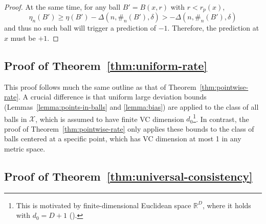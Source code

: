 \documentclass{article}
\def\X{{\mathcal X}}
\newcommand{\comment}[3]{{\color{#1} {\bf #2 :} #3}}
\newcommand{\sanjoy}[1]{\comment{orange}{Sanjoy}{#1}}
\begin{document}
\begin{proof}
At the same time, for any ball $B' = B(x, r)$ with $r < r_p(x)$,
$$ \eta_n(B') \geq \eta(B') - \Delta(n, \#_n(B'), \delta) > -\Delta(n, \#_n(B'), \delta) $$
and thus no such ball will trigger a prediction of $-1$. Therefore, the prediction at $x$ must be $+1$.
\end{proof}

\subsection{Proof of Theorem~\ref{thm:uniform-rate}}

This proof follows much the same outline as that of Theorem~\ref{thm:pointwise-rate}. A crucial difference is that uniform large deviation bounds (Lemmas~\ref{lemma:points-in-balls} and \ref{lemma:bias}) are applied to the class of all balls in $\X$, which is assumed to have finite VC dimension $d_0$\footnote{This is motivated by finite-dimensional Euclidean space $\mathbb{R}^{D}$, where it holds with $d_0 = D+1$ (\cite{dudley79}).}. In contrast, the proof of Theorem~\ref{thm:pointwise-rate} only applies these bounds to the class of balls centered at a specific point, which has VC dimension at most 1 in any metric space.




\subsection{Proof of Theorem~\ref{thm:universal-consistency}}
\end{document}
